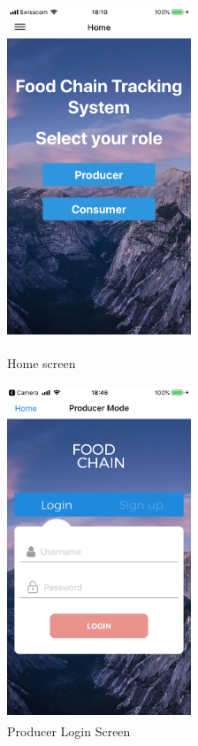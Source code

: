 \begin{figure}[!h]
	\centering
	\begin{minipage}[t]{4cm}
		\centering
		\includegraphics[width=5.5cm, height=10cm]{figures/app-1.PNG}
		\caption{Home screen}
		\label{fig:app-homescreen}
	\end{minipage}
	\hspace{3cm}
	\begin{minipage}[t]{4cm}
		\centering
		\includegraphics[width=5.5cm, height=10cm]{figures/app-3.PNG}
		\caption{Producer Login Screen}
		\label{fig:app-login-screen}
	\end{minipage}
\end{figure}


